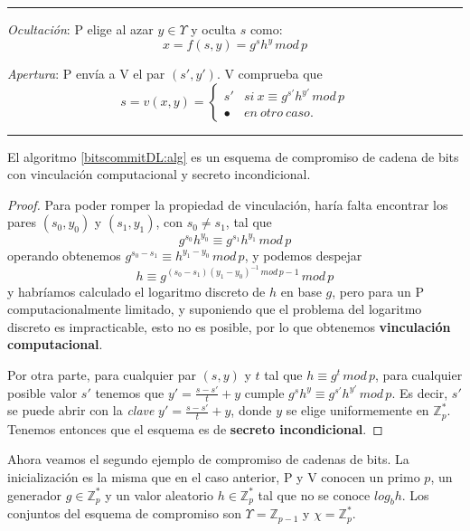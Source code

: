 \hfil

\rule{\textwidth}{1pt}
\begin{algorithm}
	\hfil
	
	\textit{Ocultación}: P elige al azar $y\in \Upsilon$ y oculta $s$ como:
	\[x = f(s,y) = g^s h^y \, mod \, p \]
	
	\textit{Apertura}: P envía a V el par $(s',y')$. V comprueba que
	\[ s = v(x,y) = 
	\begin{cases}
	s' & si\ x\equiv g^{s'} h^{y'} \, mod \, p  \\
	\bullet & en\ otro\ caso.
	\end{cases}
	\]
	\label{bitscommitDL:alg}
\end{algorithm}
\rule{\textwidth}{1pt}

\hfil



\begin{proposition}
	El algoritmo \ref{bitscommitDL:alg} es un esquema de compromiso de cadena de bits con vinculación computacional y secreto incondicional.
\end{proposition}

\begin{proof}
	Para poder romper la propiedad de vinculación, haría falta encontrar los pares $(s_0,y_0)$ y $(s_1,y_1)$, con $s_0\neq s_1$, tal que
	\[
	g^{s_0}h^{y_0} \equiv g^{s_1}h^{y_1}\, mod \, p
	\]
	operando obtenemos $g^{s_0-s_1}\equiv h^{y_1-y_0}\, mod \, p$, y podemos despejar 
	\[
	h \equiv g^{ (s_0-s_1) (y_1-y_0)^{-1} \, mod\, p-1 } \, mod \, p
	\]
	y habríamos calculado el logaritmo discreto de $h$ en base $g$, pero para un P computacionalmente limitado, y suponiendo que el problema del logaritmo discreto es impracticable, esto no es posible, por lo que obtenemos \textbf{vinculación computacional}.
	
	Por otra parte, para cualquier par $(s,y)$ y $t$ tal que $h\equiv g^t\, mod \, p$, para cualquier posible valor $s'$ tenemos que $y'=\frac{s-s'}{t} + y$ cumple $g^s h^y \equiv g^{s'} h^{y'}\, mod \, p$. Es decir, $s'$ se puede abrir con la \textit{clave} $y' = \frac{s-s'}{t} + y$, donde $y$ se elige uniformemente en $\mathbb{Z}_p^*$. Tenemos entonces que el esquema es de \textbf{secreto incondicional}.
	
\end{proof}


\hfil

Ahora veamos el segundo ejemplo de compromiso de cadenas de bits. La inicialización es la misma que en el caso anterior, P y V conocen un primo $p$, un generador $g\in \mathbb{Z}_p^*$ y un valor aleatorio $h\in \mathbb{Z}_p^*$ tal que no se conoce $log_b h$. Los conjuntos del esquema de compromiso son $\Upsilon = \mathbb{Z}_{p-1}$ y $\chi = \mathbb{Z}_p^*$.

